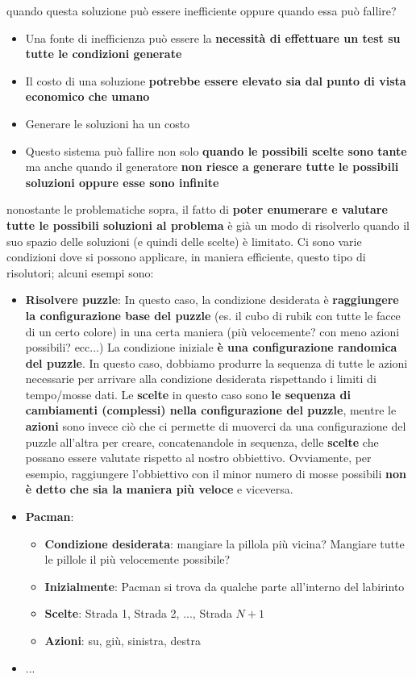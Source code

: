 \documentclass[12pt]{article}
\begin{document}
quando questa soluzione può essere inefficiente oppure quando essa può fallire?
\begin{itemize}
    \item Una fonte di inefficienza può essere la \textbf{necessità di effettuare un test su tutte le condizioni generate}
    \item Il costo di una soluzione \textbf{potrebbe essere elevato sia dal punto di vista economico che umano}
    \item Generare le soluzioni ha un costo
    \item Questo sistema può fallire non solo \textbf{quando le possibili scelte sono tante} ma anche quando il generatore \textbf{non riesce a generare tutte le possibili soluzioni oppure esse sono infinite} 
\end{itemize}
nonostante le problematiche sopra, il fatto di \textbf{poter enumerare e valutare tutte le possibili soluzioni al problema} è già un modo di risolverlo quando il suo spazio delle soluzioni (e quindi delle scelte) è limitato.
Ci sono varie condizioni dove si possono applicare, in maniera efficiente, questo tipo di risolutori; alcuni esempi sono:
\begin{itemize}
    \item \textbf{Risolvere puzzle}: In questo caso, la condizione desiderata è \textbf{raggiungere la configurazione base del puzzle} (es. il cubo di rubik con tutte le facce di un certo colore) in una certa maniera (più velocemente? con meno azioni possibili? ecc...)
    La condizione iniziale \textbf{è una configurazione randomica del puzzle}. In questo caso, dobbiamo produrre la sequenza di tutte le azioni necessarie per arrivare alla condizione desiderata rispettando i limiti di tempo/mosse dati.
    Le \textbf{scelte} in questo caso sono \textbf{le sequenza di cambiamenti (complessi) nella configurazione del puzzle}, mentre le \textbf{azioni} sono invece ciò che ci permette di muoverci da una configurazione del puzzle all'altra per creare, concatenandole in sequenza, delle \textbf{scelte} che possano essere valutate rispetto al nostro obbiettivo.
    Ovviamente, per esempio, raggiungere l'obbiettivo con il minor numero di mosse possibili \textbf{non è detto che sia la maniera più veloce} e viceversa.
    \newpage
    \item \textbf{Pacman}:
    \begin{itemize}
        \item \textbf{Condizione desiderata}: mangiare la pillola più vicina? Mangiare tutte le pillole il più velocemente possibile?
        \item \textbf{Inizialmente}: Pacman si trova da qualche parte all'interno del labirinto
        \item \textbf{Scelte}: Strada 1, Strada 2, ..., Strada $N + 1$
        \item \textbf{Azioni}: su, giù, sinistra, destra
    \end{itemize}
    \item ...
\end{itemize}
\end{document}
